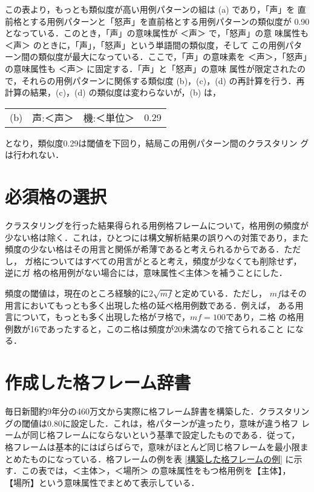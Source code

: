 \vspace*{1ex}

この表より，もっとも類似度が高い用例パターンの組は (a) であり，「声」を
直前格とする用例パターンと「怒声」を直前格とする用例パターンの類似度が
0.90となっている．このとき，「声」の意味属性が ＜声＞ で，「怒声」の意
味属性も ＜声＞ のときに，「声」，「怒声」という単語間の類似度，そして
この用例パターン間の類似度が最大になっている．ここで，「声」の意味素を 
＜声＞，「怒声」の意味属性も ＜声＞ に固定する．「声」と「怒声」の意味
属性が限定されたので，それらの用例パターンに関係する類似度 (b)，(c)，(d) 
の再計算を行う．再計算の結果，(c)，(d) の類似度は変わらないが，(b) は，

\vspace*{1ex}

\begin{tabular}{lllr}
 (b) & 声:＜声＞ & 機:＜単位＞ & 0.29
\end{tabular}

\vspace*{1ex}

\noindent
となり，類似度0.29は閾値を下回り，結局この用例パターン間のクラスタリン
グは行われない．


\section{必須格の選択}

クラスタリングを行った結果得られる用例格フレームについて，格用例の頻度が
少ない格は除く．これは，ひとつには構文解析結果の誤りへの対策であり，また
頻度の少ない格はその用言と関係が希薄であると考えられるからである．ただし，
ガ格についてはすべての用言がとると考え，頻度が少なくても削除せず，逆にガ
格の格用例がない場合には，意味属性＜主体＞を補うことにした．

頻度の閾値は，現在のところ経験的に$2 \sqrt{mf}$と定めている．ただし，
$mf$はその用言においてもっとも多く出現した格の延べ格用例数である．例えば，
ある用言について，もっとも多く出現した格がヲ格で，$mf = 100$であり，ニ格
の格用例数が16であったすると，このニ格は頻度が20未満なので捨てられること
になる．


\section{作成した格フレーム辞書}

毎日新聞約9年分の460万文から実際に格フレーム辞書を構築した．クラスタリン
グの閾値は$0.80$に設定した．これは，格パターンが違ったり，意味が違う格フ
レームが同じ格フレームにならないという基準で設定したものである．従って，
格フレームは基本的にはばらばらで，意味がほとんど同じ格フレームを最小限ま
とめたものになっている．格フレームの例を表 \ref{構築した格フレームの例}
に示す．この表では，＜主体＞，＜場所＞ の意味属性をもつ格用例を【主体】，
【場所】という意味属性でまとめて表示している．

